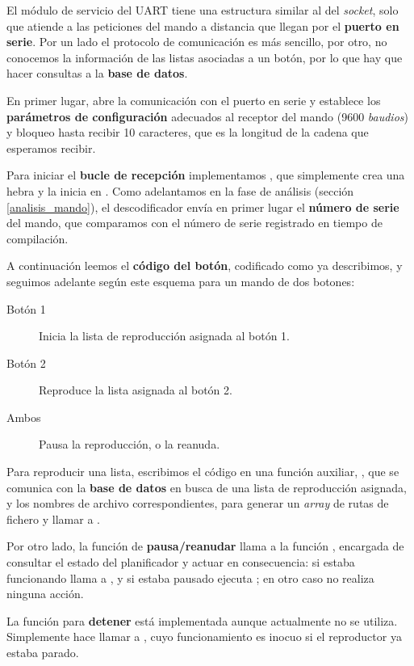 El módulo de servicio del \acrshort{UART} tiene una estructura similar al del \textit{socket}, solo que atiende a las peticiones del mando a distancia que llegan por el \textbf{puerto en serie}. Por un lado el protocolo de comunicación es más sencillo, por otro, no conocemos la información de las listas asociadas a un botón, por lo que hay que hacer consultas a la \textbf{base de datos}.

En primer lugar,  abre la comunicación con el puerto en serie y establece los \textbf{parámetros de configuración} adecuados al receptor del mando (9600 \textit{baudios}) y bloqueo hasta recibir 10 caracteres, que es la longitud de la cadena que esperamos recibir.

Para iniciar el \textbf{bucle de recepción} implementamos , que simplemente crea una hebra y la inicia en . Como adelantamos en la fase de análisis (sección \ref{analisis_mando}), el descodificador envía en primer lugar el \textbf{número de serie} del mando, que comparamos con el número de serie registrado en tiempo de compilación. 

A continuación leemos el \textbf{código del botón}, codificado como ya describimos, y seguimos adelante según este esquema para un mando de dos botones:

\begin{description}
	\item[Botón 1] Inicia la lista de reproducción asignada al botón 1.
	\item[Botón 2] Reproduce la lista asignada al botón 2.
	\item[Ambos] Pausa la reproducción, o la reanuda.
\end{description}

Para reproducir una lista, escribimos el código en una función auxiliar, , que se comunica con la \textbf{base de datos} en busca de una lista de reproducción asignada, y los nombres de archivo correspondientes, para generar un \textit{array} de rutas de fichero y llamar a .

Por otro lado, la función de \textbf{pausa/reanudar} llama a la función , encargada de consultar el estado del planificador y actuar en consecuencia: si estaba funcionando llama a , y si estaba pausado ejecuta ; en otro caso no realiza ninguna acción.

La función para \textbf{detener} está implementada aunque actualmente no se utiliza. Simplemente hace llamar a , cuyo funcionamiento es inocuo si el reproductor ya estaba parado.

